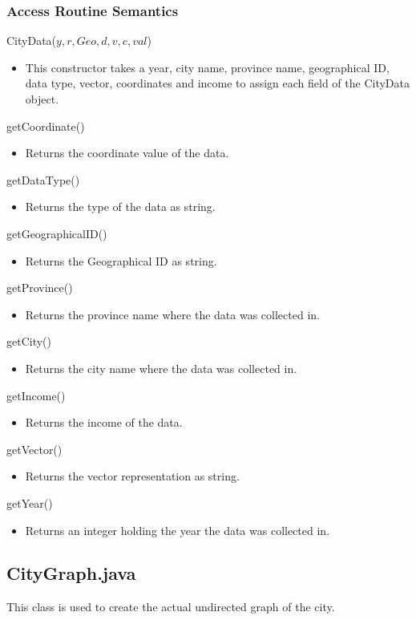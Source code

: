 \documentclass[12pt,fleqn]{article}
\begin{document}
\subsubsection*{Access Routine Semantics}
\noindent CityData($y, r, Geo, d, v, c, val$)
\begin{itemize}
\item This constructor takes a year, city name, province name, geographical ID, data type, vector, coordinates
and income to assign each field of the CityData object.
\end{itemize}
\noindent getCoordinate()
\begin{itemize}
\item Returns the coordinate value of the data.
\end{itemize}
\noindent getDataType()
\begin{itemize}
\item Returns the type of the data as string.
\end{itemize}
\noindent getGeographicalID()
\begin{itemize}
\item Returns the Geographical ID as string.
\end{itemize}
\noindent getProvince()
\begin{itemize}
\item Returns the province name where the data was collected in.
\end{itemize}
\noindent getCity()
\begin{itemize}
\item Returns the city name where the data was collected in.
\end{itemize}
\noindent getIncome()
\begin{itemize}
\item Returns the income of the data.
\end{itemize}
\noindent getVector()
\begin{itemize}
\item Returns the vector representation as string.
\end{itemize}
\noindent getYear()
\begin{itemize}
\item Returns an integer holding the year the data was collected in.
\end{itemize}


\subsection*{CityGraph.java}\label{graph}
This class is used to create the actual undirected graph of the city.
\end{document}
